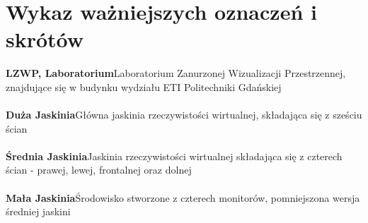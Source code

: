 \chapter*{Wykaz ważniejszych oznaczeń i skrótów}

\newcommand\acronym[2]{\textbf{#1}\quad #2 \\\\}

\noindent
\acronym{LZWP, Laboratorium}{Laboratorium Zanurzonej Wizualizacji Przestrzennej, znajdujące się w budynku wydziału ETI Politechniki Gdańskiej}
\acronym{Duża Jaskinia}{Główna jaskinia rzeczywistości wirtualnej, składająca się z sześciu ścian}
\acronym{Średnia Jaskinia}{Jaskinia rzeczywistości wirtualnej składająca się z czterech ścian - prawej, lewej, frontalnej oraz dolnej}
\acronym{Mała Jaskinia}{Środowisko stworzone z czterech monitorów, pomniejszona wersja średniej jaskini}

